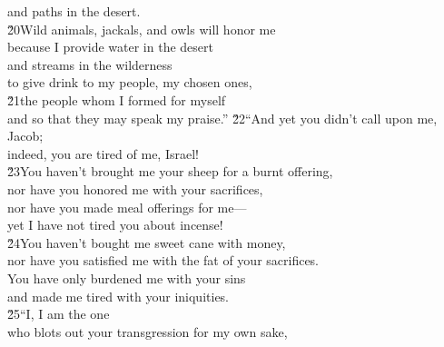 \begin{poetry}
\poemll    and paths in the desert. \\
\poeml \v{20}Wild animals, jackals, and owls will honor me \\
\poemll    because I provide water in the desert \\
\poeml and streams in the wilderness \\
\poemll    to give drink to my people, my chosen ones, \\
\poeml \v{21}the people whom I formed for myself \\
\poemll    and so that they may speak my praise.''
\poeml \v{22}``And yet you didn't call upon me, Jacob; \\
\poemll    indeed, you are tired of me, Israel! \\
\poeml \v{23}You haven't brought me your sheep for a burnt offering, \\
\poemll    nor have you honored me with your sacrifices, \\
\poeml nor have you made meal offerings for me--- \\
\poemll    yet I have not tired you about incense! \\
\poeml \v{24}You haven't bought me sweet cane with money, \\
\poemll    nor have you satisfied me with the fat of your sacrifices. \\
\poeml You have only burdened me with your sins \\
\poemll    and made me tired with your iniquities. \\
\poeml \v{25}``I, I am the one \\
\poemll    who blots out your transgression for my own sake, \\

\end{poetry}
